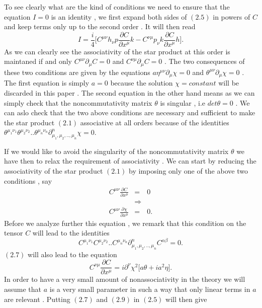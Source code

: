 \documentclass[a4paper,12pt]{article}
\begin{document}
To see clearly what are the kind of conditions we need to ensure
that the equation $I=0$ is an identity , we first expand both
sides of $(2.5)$ in powers of $C$ and keep terms only up to the second
order . It will then read
\begin{equation}
I=\frac{i}{4}\bigg[C^{{\mu}{\nu}}h_{\nu}p{\frac{{\partial}C}{{\partial}x^{\mu}}}k
-C^{{\nu}{\mu}}p_{\nu}k{\frac{{\partial}C}{{\partial}x^{\mu}}}h\bigg].
\end{equation}
As we can clearly see the associativity of the star product at
this order is maintaned if and only
$C^{{\mu}{\nu}}{\partial}_{\mu} C=0 $ and $
C^{{\nu}{\mu}}{\partial}_{\mu} C=0 $ . The two consequences of
these two conditions are given by the equations $
a{\eta}^{{\mu}{\nu}}{\partial}_{\mu}{\chi}=0 $ and
${\theta}^{{\mu}{\nu}}{\partial}_{\mu}{\chi}=0$ . The first
equation is simply $a=0$ because the solution ${\chi}=constant$
will be discarded in this paper . The second equation in the
other hand means as we can simply check that the noncommutativity
matrix $\theta$ is singular , i.e $det{\theta}=0$ . We can aslo
check that the two above conditions are necessary and sufficient
to make the star product $(2.1)$ associative at all orders
because of the identities $
{\theta}^{{\mu}_{1}{\nu}_{1}}{\theta}^{{\mu}_{2}{\nu}_{2}}..{\theta}^{{\mu}_{n}{\nu}_{n}}{\partial}^{n}_{{\mu}_1,{\mu}_2,..,{\mu}_n}
{\chi}=0 $.


If we would like to avoid the singularity of the noncommutativity
matrix $\theta$ we have then to relax the requirement of
associativity . We can start by reducing the associativity of the
star product $(2.1)$ by imposing only one of the above two
conditions , say
\begin{eqnarray}
C^{{\mu}{\nu}}\frac{\partial C}{\partial{x^{\mu}}}&=&0\nonumber\\
&{\Longrightarrow}&\nonumber\\
C^{{\mu}{\nu}}\frac{\partial{\chi}}{\partial{x^{\mu}}}&=&0.
\end{eqnarray}
Before we analyze further this equation , we remark that this
condition on the tensor $C$ will lead to the identities
\begin{equation}
C^{{\mu}_{1}{\nu}_{1}}C^{{\mu}_{2}{\nu}_{2}}..C^{{\mu}_{n}{\nu}_{n}}{\partial}^{n}_{{\mu}_1,{\mu}_2,..,{\mu}_n}
{C^{{\alpha}{\beta}}}=0 .
\end{equation}
$(2.7)$ will also lead to the equation
\begin{equation}
C^{{\nu}{\mu}}\frac{\partial
C}{\partial{x^{\mu}}}=i{\partial}^{\nu}{\chi}^2\bigg[a{\theta} +
i a^2{\eta}\bigg].
\end{equation}
In order to have a very small amount of nonassociativity in the
theory we will assume that $a$ is a very small parameter in such a
way that only linear terms in $a$ are relevant . Putting $(2.7)$
and $(2.9)$ in $(2.5)$ will then give
\end{document}
